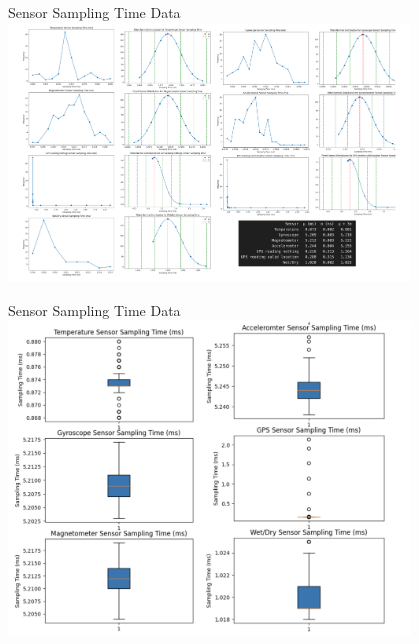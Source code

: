 


\begin{frame}{Sensor Sampling Time Data}
    \centering
    \includegraphics[height=0.8\textheight,width=0.8\textwidth,keepaspectratio]{images/samplingtimegraphs.png}
\end{frame}

\begin{frame}{Sensor Sampling Time Data}
    \centering
    \includegraphics[height=0.8\textheight,width=0.8\textwidth,keepaspectratio]{images/boxplots.png}
\end{frame}

